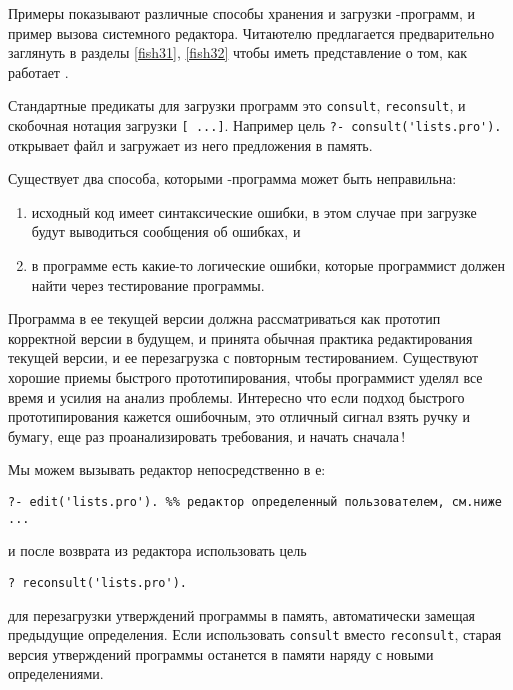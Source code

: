 \label{fish24}

Примеры показывают различные способы хранения и загрузки \prolog-программ, и
пример вызова системного редактора. Читаютелю предлагается предварительно
заглянуть в разделы \ref{fish31}, \ref{fish32} чтобы иметь представление о том,
как работает \prolog.

Стандартные предикаты для загрузки программ это \verb'consult',
\verb'reconsult', и скобочная нотация загрузки \verb'[ ...]'. Например цель
\verb|?- consult('lists.pro').| открывает файл  и загружает из
него предложения в память.

Существует два способа, которыми \prolog-программа может быть неправильна:
\begin{enumerate}[nosep]
\item исходный код имеет синтаксические ошибки, в этом случае при загрузке будут
выводиться сообщения об ошибках, и
\item в программе есть какие-то логические ошибки, которые программист должен
найти через тестирование программы.
\end{enumerate}
Программа в ее текущей версии должна рассматриваться как прототип корректной
версии в будущем, и принята обычная практика редактирования текущей версии, и ее
перезагрузка с повторным тестированием. Существуют хорошие приемы быстрого
прототипирования, чтобы программист уделял все время и усилия на анализ
проблемы. Интересно что если подход быстрого прототипирования кажется ошибочным,
это отличный сигнал взять ручку и бумагу, еще раз проанализировать требования, и
начать сначала\,!

Мы можем вызывать редактор непосредственно в \prolog е:
\begin{verbatim}
?- edit('lists.pro'). %% редактор определенный пользователем, см.ниже ...
\end{verbatim}
и после возврата из редактора использовать цель
\begin{verbatim}
? reconsult('lists.pro').
\end{verbatim}
для перезагрузки утверждений программы в память, автоматически замещая
предыдущие определения. Если использовать \verb'consult' вместо
\verb'reconsult', старая версия утверждений
программы останется в памяти наряду с новыми определениями.
 
